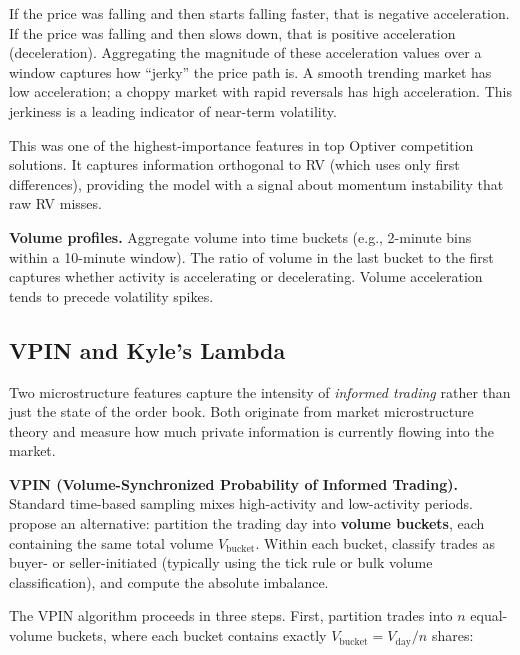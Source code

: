 \begin{intuition}
If the price was falling and then starts falling faster, that is negative acceleration. If the price was falling and then slows down, that is positive acceleration (deceleration). Aggregating the magnitude of these acceleration values over a window captures how ``jerky'' the price path is. A smooth trending market has low acceleration; a choppy market with rapid reversals has high acceleration. This jerkiness is a leading indicator of near-term volatility.
\end{intuition}

\begin{projectconnection}
This was one of the highest-importance features in top Optiver competition solutions. It captures information orthogonal to RV (which uses only first differences), providing the model with a signal about momentum instability that raw RV misses.
\end{projectconnection}

\textbf{Volume profiles.}
Aggregate volume into time buckets (e.g., 2-minute bins within a 10-minute window).
The ratio of volume in the last bucket to the first captures whether activity is accelerating or decelerating.
Volume acceleration tends to precede volatility spikes.

\subsection{VPIN and Kyle's Lambda}\label{sec:feat-vpin-kyle}

Two microstructure features capture the intensity of \emph{informed trading} rather than just the state of the order book.
Both originate from market microstructure theory and measure how much private information is currently flowing into the market.

\textbf{VPIN (Volume-Synchronized Probability of Informed Trading).}
Standard time-based sampling mixes high-activity and low-activity periods.
\citet{EasleyLopezOHara2012} propose an alternative: partition the trading day into \textbf{volume buckets}, each containing the same total volume $V_{\text{bucket}}$.
Within each bucket, classify trades as buyer- or seller-initiated (typically using the tick rule or bulk volume classification), and compute the absolute imbalance.

The VPIN algorithm proceeds in three steps.
First, partition trades into $n$ equal-volume buckets, where each bucket contains exactly $V_{\text{bucket}} = V_{\text{day}} / n$ shares:

